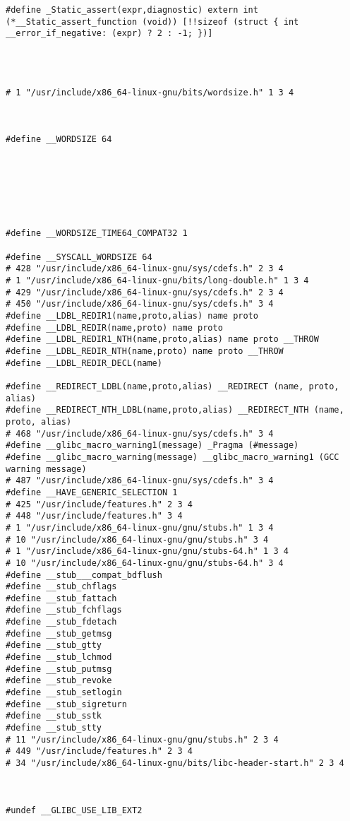\documentclass[11pt]{article}
\begin{document}
\begin{enumerate}
\begin{verbatim}
#define _Static_assert(expr,diagnostic) extern int (*__Static_assert_function (void)) [!!sizeof (struct { int __error_if_negative: (expr) ? 2 : -1; })]




# 1 "/usr/include/x86_64-linux-gnu/bits/wordsize.h" 1 3 4



#define __WORDSIZE 64







#define __WORDSIZE_TIME64_COMPAT32 1

#define __SYSCALL_WORDSIZE 64
# 428 "/usr/include/x86_64-linux-gnu/sys/cdefs.h" 2 3 4
# 1 "/usr/include/x86_64-linux-gnu/bits/long-double.h" 1 3 4
# 429 "/usr/include/x86_64-linux-gnu/sys/cdefs.h" 2 3 4
# 450 "/usr/include/x86_64-linux-gnu/sys/cdefs.h" 3 4
#define __LDBL_REDIR1(name,proto,alias) name proto
#define __LDBL_REDIR(name,proto) name proto
#define __LDBL_REDIR1_NTH(name,proto,alias) name proto __THROW
#define __LDBL_REDIR_NTH(name,proto) name proto __THROW
#define __LDBL_REDIR_DECL(name) 

#define __REDIRECT_LDBL(name,proto,alias) __REDIRECT (name, proto, alias)
#define __REDIRECT_NTH_LDBL(name,proto,alias) __REDIRECT_NTH (name, proto, alias)
# 468 "/usr/include/x86_64-linux-gnu/sys/cdefs.h" 3 4
#define __glibc_macro_warning1(message) _Pragma (#message)
#define __glibc_macro_warning(message) __glibc_macro_warning1 (GCC warning message)
# 487 "/usr/include/x86_64-linux-gnu/sys/cdefs.h" 3 4
#define __HAVE_GENERIC_SELECTION 1
# 425 "/usr/include/features.h" 2 3 4
# 448 "/usr/include/features.h" 3 4
# 1 "/usr/include/x86_64-linux-gnu/gnu/stubs.h" 1 3 4
# 10 "/usr/include/x86_64-linux-gnu/gnu/stubs.h" 3 4
# 1 "/usr/include/x86_64-linux-gnu/gnu/stubs-64.h" 1 3 4
# 10 "/usr/include/x86_64-linux-gnu/gnu/stubs-64.h" 3 4
#define __stub___compat_bdflush 
#define __stub_chflags 
#define __stub_fattach 
#define __stub_fchflags 
#define __stub_fdetach 
#define __stub_getmsg 
#define __stub_gtty 
#define __stub_lchmod 
#define __stub_putmsg 
#define __stub_revoke 
#define __stub_setlogin 
#define __stub_sigreturn 
#define __stub_sstk 
#define __stub_stty 
# 11 "/usr/include/x86_64-linux-gnu/gnu/stubs.h" 2 3 4
# 449 "/usr/include/features.h" 2 3 4
# 34 "/usr/include/x86_64-linux-gnu/bits/libc-header-start.h" 2 3 4



#undef __GLIBC_USE_LIB_EXT2





\end{verbatim}
\end{enumerate}
\end{document}
